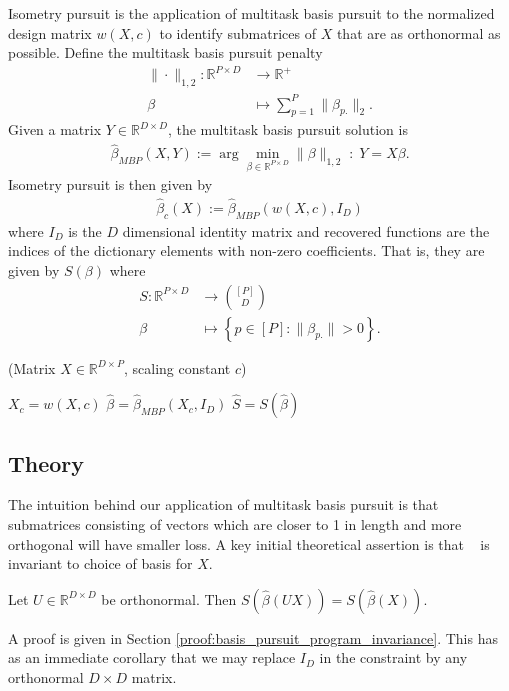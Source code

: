 Isometry pursuit is the application of multitask basis pursuit to the normalized design matrix $w(X, c)$ to identify submatrices of $ X$ that are as orthonormal as possible.
Define the multitask basis pursuit penalty 
\begin{align}
\label{eq:bp}
\| \cdot \|_{1,2}: \mathbb R^{P \times D} &\to \mathbb R^+ \\ 
\beta &\mapsto  \sum_{p=1}^P  \|\beta_{p.}\|_2.
\end{align}
Given a matrix $Y \in \mathbb R^{D \times D}$, the multitask basis pursuit solution is
\begin{align}
\label{prog:multitask_basis_pursuit}
\widehat \beta_{MBP} (X, Y)  := \arg \min_{\beta \in \mathbb R^{P \times D}} \| \beta \|_{1,2} \; : \;Y =  X \beta.
\end{align}
Isometry pursuit is then given by
\begin{align}
\label{prog:isometry_pursuit}
\widehat \beta_c ( X) := \widehat \beta_{MBP} ( w(X,c), I_D )
\end{align}
where $I_D$ is the $D$ dimensional identity matrix and recovered functions are the indices of the dictionary elements with non-zero coefficients.
That is, they are given by $S(\beta)$ where
\begin{align}
S: \mathbb{R}^{P \times D} &\to \binom{[P]}{D} \\
\beta &\mapsto \left\{ p \in [P] :  \|\beta_{p.}\| > 0 \right\}.
\end{align}
\begin{algorithm}[H]
\caption{\isometrypursuit(Matrix ${X} \in \mathbb{R}^{D \times P}$, scaling constant $c$)}
\begin{algorithmic}[1]
 $X_c = w({X},c)$
 $\widehat \beta = \widehat \beta_{MBP} (X_c, I_D)$
 $\widehat{S} = S (\widehat \beta)$
\end{algorithmic}
\end{algorithm}

\subsection{Theory}

The intuition behind our application of multitask basis pursuit is that submatrices consisting of vectors which are closer to 1 in length and more orthogonal will have smaller loss.
A key initial theoretical assertion is that  \isometrypursuit~ is invariant to choice of basis for $ X$.
\begin{proposition}
\label{prop:basis_pursuit_selection_invariance}
Let $U \in \mathbb R^{D \times D}$ be orthonormal.
Then $S(\widehat \beta  (U  X)) = S(\widehat \beta ( X))$.
\end{proposition}
A proof is given in Section \ref{proof:basis_pursuit_program_invariance}.
This has as an immediate corollary that we may replace $I_D$ in the constraint by any orthonormal $D \times D$ matrix.

